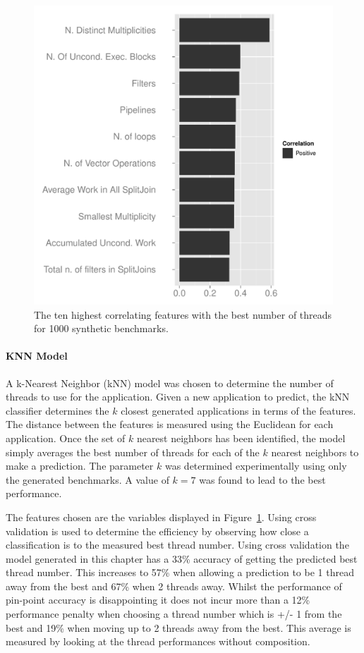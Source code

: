\begin{figure}
  \includegraphics[width=1\textwidth]{streamit-paper/graphics/corrGraph.pdf}
  \caption{The ten highest correlating features with the best number of threads for 1000 synthetic benchmarks.}\label{fig:corr}
\end{figure}
 
\paragraph{KNN Model}

A k-Nearest Neighbor (kNN) model was chosen to determine the number of threads to use for the application.
Given a new application to predict, the kNN classifier determines the $k$ closest generated applications in terms of the features.
The distance between the features is measured using the Euclidean for each application.
Once the set of $k$ nearest neighbors has been identified, the model simply averages the best number of threads for each of the $k$ nearest neighbors to make a prediction.
The parameter $k$ was determined experimentally using only the generated benchmarks.
A value of $k=7$ was found to lead to the best performance.

The features chosen are the variables displayed in Figure~\ref{fig:corr}.
Using cross validation is used to determine the efficiency by observing how close a classification is to the measured best thread number.
Using cross validation the model generated in this chapter has a 33\% accuracy of getting the predicted best thread number.
This increases to 57\% when allowing a prediction to be 1 thread away from the best and 67\% when 2 threads away.
Whilst the performance of pin-point accuracy is disappointing it does not incur more than a 12\% performance penalty when choosing a thread number which is +/- 1 from the best and 19\% when moving up to 2 threads away from the best.
This average is measured by looking at the thread performances without composition.

